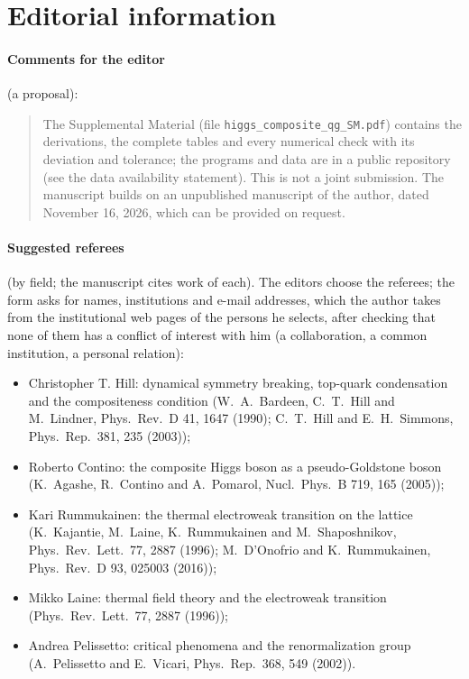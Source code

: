 \documentclass[11pt]{article}
\begin{document}
\section{Editorial information}
\label{sec:editorial}

\paragraph{Comments for the editor} (a proposal):
\begin{quote}
The Supplemental Material (file \texttt{higgs\_composite\_qg\_SM.pdf}) contains the derivations, the complete tables and
every numerical check with its deviation and tolerance; the programs and data are in a public repository (see the data
availability statement). This is not a joint submission. The manuscript builds on an unpublished manuscript of the author,
dated November 16, 2026, which can be provided on request.
\end{quote}

\paragraph{Suggested referees} (by field; the manuscript cites work of each). The editors choose the referees; the form
asks for names, institutions and e-mail addresses, which the author takes from the institutional web pages of the persons
he selects, after checking that none of them has a conflict of interest with him (a collaboration, a common institution,
a personal relation):
\begin{itemize}
\item Christopher T. Hill: dynamical symmetry breaking, top-quark condensation and the compositeness condition (W.~A.~Bardeen,
C.~T.~Hill and M.~Lindner, Phys.\ Rev.\ D 41, 1647 (1990); C.~T.~Hill and E.~H.~Simmons, Phys.\ Rep.\ 381, 235 (2003));
\item Roberto Contino: the composite Higgs boson as a pseudo-Goldstone boson (K.~Agashe, R.~Contino and A.~Pomarol, Nucl.\
Phys.\ B 719, 165 (2005));
\item Kari Rummukainen: the thermal electroweak transition on the lattice (K.~Kajantie, M.~Laine, K.~Rummukainen and
M.~Shaposhnikov, Phys.\ Rev.\ Lett.\ 77, 2887 (1996); M.~D'Onofrio and K.~Rummukainen, Phys.\ Rev.\ D 93, 025003 (2016));
\item Mikko Laine: thermal field theory and the electroweak transition (Phys.\ Rev.\ Lett.\ 77, 2887 (1996));
\item Andrea Pelissetto: critical phenomena and the renormalization group (A.~Pelissetto and E.~Vicari, Phys.\ Rep.\ 368,
549 (2002)).
\end{itemize}
\end{document}

